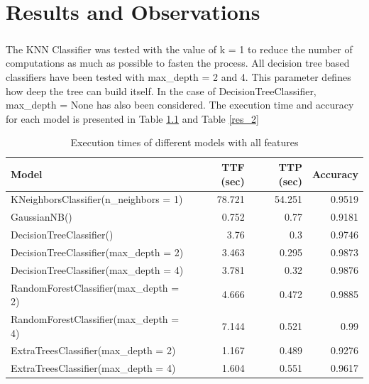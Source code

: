 \chapter{Results and Observations}
\label{ch:SC}

\paragraph{}
The KNN Classifier was tested with the value of k = 1 to reduce the number of computations as much as possible to fasten the process. All decision tree based classifiers have been tested with max\_depth = 2 and 4. This parameter defines how deep the tree can build itself. In the case of DecisionTreeClassifier, max\_depth = None has also been considered. The execution time and accuracy for each model is presented in Table \ref{res_all} and Table \ref{res_2}

\begin{table}[h]
    \caption{Execution times of different models with all features}
    \centering
    \label{res_all}
    \begin{tabular}{| l | r | r | r |}
        \hline
        \textbf{Model} & \textbf{TTF (sec)} & \textbf{TTP (sec)} & \textbf{Accuracy} \\
        \hline
        KNeighborsClassifier(n\_neighbors = 1) & 78.721 & 54.251 & 0.9519 \\
        \hline
        GaussianNB() & 0.752 & 0.77 & 0.9181 \\
        \hline
        DecisionTreeClassifier() & 3.76 & 0.3 & 0.9746 \\
        \hline
        DecisionTreeClassifier(max\_depth = 2) & 3.463 & 0.295 & 0.9873 \\
        \hline
        DecisionTreeClassifier(max\_depth = 4) & 3.781 & 0.32 & 0.9876 \\
        \hline
        RandomForestClassifier(max\_depth = 2) & 4.666 & 0.472 & 0.9885 \\
        \hline
        RandomForestClassifier(max\_depth = 4) & 7.144 & 0.521 & 0.99 \\
        \hline
        ExtraTreesClassifier(max\_depth = 2) & 1.167 & 0.489 & 0.9276 \\
        \hline
        ExtraTreesClassifier(max\_depth = 4) & 1.604 & 0.551 & 0.9617 \\
        \hline
    \end{tabular}
\end{table}

